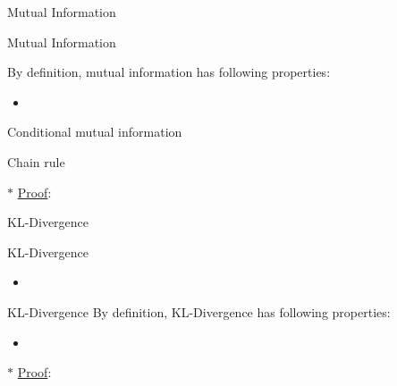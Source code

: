 \documentclass[9pt]{beamer}
\begin{document}
    \begin{section}{Mutual Information}
        \begin{frame}{Mutual Information}

            \begin{definition}
                
            \end{definition}
            
            By definition, mutual information has following properties:
            \begin{itemize}
                \item 
            \end{itemize}
        \end{frame}

        \begin{frame}{Conditional mutual information}
            \begin{definition}
                
            \end{definition}
        \end{frame}
        
        \begin{frame}{Chain rule}
            \begin{theorem}
                
            \end{theorem}
            $\ast$ \underline{Proof}: 
        \end{frame}
    \end{section}

    \begin{section}{KL-Divergence}
        \begin{frame}{KL-Divergence}

            \begin{definition}[KL-divergence]
                
            \end{definition}
            \begin{itemize}
                \item 
            \end{itemize}
        \end{frame}

        \begin{frame}{KL-Divergence}
            By definition, KL-Divergence has following properties:
            \begin{itemize}
                \item 
            \end{itemize}

            $\ast$ \underline{Proof}:
        
        \end{frame}

    \end{section}
\end{document}
